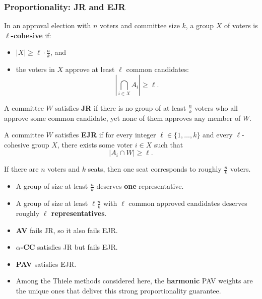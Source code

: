 \separator

\subsubsection{Proportionality: JR and EJR}

\begin{defbox}
In an approval election with $n$ voters and committee size $k$, a group $X$ of voters is \textbf{$\ell$-cohesive} if:
\begin{itemize}
  \item $|X| \geq \ell \cdot \frac{n}{k}$, and
  \item the voters in $X$ approve at least $\ell$ common candidates:
  \[
    \left|\bigcap_{i\in X} A_i\right| \geq \ell.
  \]
\end{itemize}
\end{defbox}

\begin{defbox}
A committee $W$ satisfies \textbf{JR} if there is no group of at least $\frac{n}{k}$ voters who all approve some common candidate, yet none of them approves any member of $W$.
\end{defbox}

\begin{defbox}
A committee $W$ satisfies \textbf{EJR} if for every integer $\ell \in \{1,\ldots,k\}$ and every $\ell$-cohesive group $X$, there exists some voter $i\in X$ such that
\[
  |A_i \cap W| \geq \ell.
\]
\end{defbox}

\begin{tipbox}[Interpretation]
If there are $n$ voters and $k$ seats, then one seat corresponds to roughly $\frac{n}{k}$ voters.
\begin{itemize}
  \item A group of size at least $\frac{n}{k}$ deserves \textbf{one} representative.
  \item A group of size at least $\ell\frac{n}{k}$ with $\ell$ common approved candidates deserves roughly \textbf{$\ell$ representatives}.
\end{itemize}
\end{tipbox}

\begin{thmbox}
\begin{itemize}
  \item \textbf{AV} fails JR, so it also fails EJR.
  \item \textbf{$\alpha$-CC} satisfies JR but fails EJR.
  \item \textbf{PAV} satisfies EJR.
  \item Among the Thiele methods considered here, the \textbf{harmonic} PAV weights are the unique ones that deliver this strong proportionality guarantee.
\end{itemize}
\end{thmbox}

